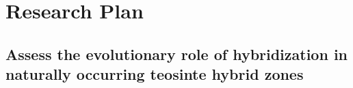 \section*{Research Plan}



\subsection{Assess the evolutionary role of hybridization in naturally occurring teosinte hybrid zones}
\label{ss:hybrids}

